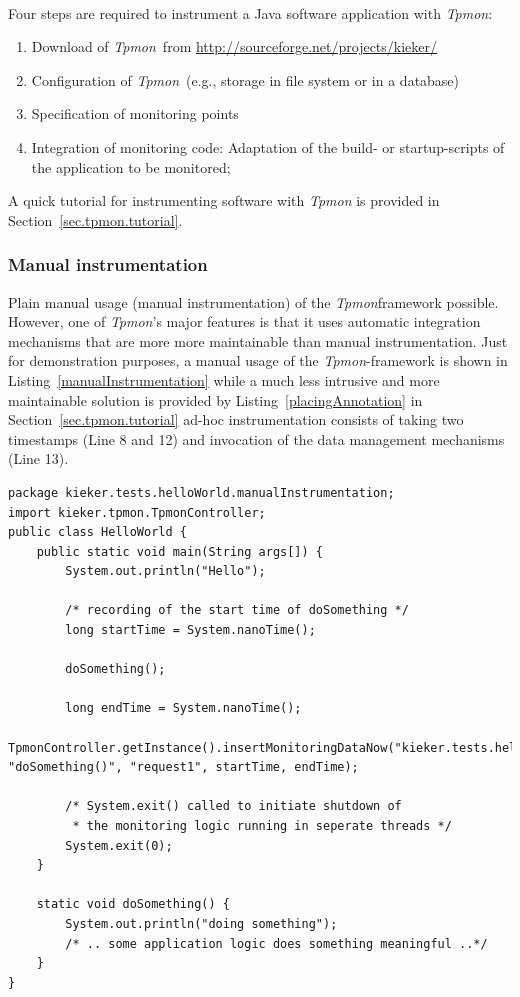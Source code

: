 \documentclass[a4paper,12pt]{scrartcl}
\newcommand{\tpmon}{\textit{Tpmon}}
\newcommand{\kiekerurl}{\small\url{http://sourceforge.net/projects/kieker/}\normalsize}
\begin{document}
\

Four steps are required to instrument a Java software application with \tpmon:
\begin{enumerate}
\item Download of \tpmon\ from \kiekerurl
\item Configuration of \tpmon\  (e.g., storage in file system or in a database)
\item Specification of monitoring points 
\item Integration of monitoring code: Adaptation of the build- or startup-scripts of the application to be monitored; 
\end{enumerate}

A quick tutorial for instrumenting software with \tpmon{} is provided in Section~\ref{sec.tpmon.tutorial}.

\subsubsection{Manual instrumentation}
Plain manual usage (manual instrumentation) of the \tpmon framework possible. However, one of \tpmon's major features is that it uses automatic integration mechanisms that are more more maintainable than manual instrumentation. Just for demonstration purposes, a manual usage of the \tpmon-framework is shown in Listing~\ref{manualInstrumentation} while a much less intrusive and more maintainable solution is provided by Listing~\ref{placingAnnotation} in Section~\ref{sec.tpmon.tutorial} ad-hoc instrumentation consists of taking two timestamps (Line 8 and 12) and invocation of the data management mechanisms (Line 13).

\begin{lstlisting}[caption={\footnotesize\texttt{src/kieker/tests/helloWorld/manualInstrumentation/HelloWorld.java}},label={manualInstrumentation}]
package kieker.tests.helloWorld.manualInstrumentation;
import kieker.tpmon.TpmonController;
public class HelloWorld {
    public static void main(String args[]) {
        System.out.println("Hello");
        
        /* recording of the start time of doSomething */
        long startTime = System.nanoTime();
        
        doSomething();
        
        long endTime = System.nanoTime();
        TpmonController.getInstance().insertMonitoringDataNow("kieker.tests.helloWorld.manualInstrumentation.HelloWorld", "doSomething()", "request1", startTime, endTime);
                
        /* System.exit() called to initiate shutdown of 
         * the monitoring logic running in seperate threads */
        System.exit(0);
    }

    static void doSomething() {
        System.out.println("doing something");
        /* .. some application logic does something meaningful ..*/        
    }
}
\end{lstlisting}
\end{document}

